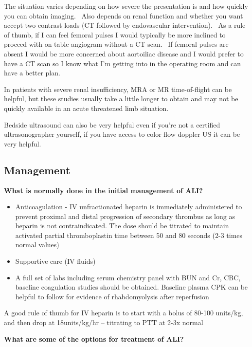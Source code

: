 \documentclass[
]{book}
\begin{document}
The situation varies depending on how severe the presentation is and how
quickly you can obtain imaging.~ Also depends on renal function and
whether you want accept two contrast loads (CT followed by endovascular
intervention).~ As a rule of thumb, if I can feel femoral pulses I would
typically be more inclined to proceed with on-table angiogram without a
CT scan.~ If femoral pulses are absent I would be more concerned about
aortoiliac disease and I would prefer to have a CT scan so I know what
I'm getting into in the operating room and can have a better plan.

In patients with severe renal insufficiency, MRA or MR time-of-flight
can be helpful, but these studies usually take a little longer to obtain
and may not be quickly available in an acute threatened limb situation.

Bedside ultrasound can also be very helpful even if you're not a
certified ultrasonographer yourself, if you have access to color flow
doppler US it can be very helpful.

\hypertarget{management-3}{%
\subsection{Management}\label{management-3}}

\textbf{What is normally done in the initial management of ALI?}

\begin{itemize}
\item
  Anticoagulation - IV unfractionated heparin is immediately
  administered to prevent proximal and distal progression of secondary
  thrombus as long as heparin is not contraindicated. The dose should
  be titrated to maintain activated partial thromboplastin time
  between 50 and 80 seconds (2-3 times normal values)
\item
  Supportive care (IV fluids)
\item
  A full set of labs including serum chemistry panel with BUN and Cr,
  CBC, baseline coagulation studies should be obtained. Baseline
  plasma CPK can be helpful to follow for evidence of rhabdomyolysis
  after reperfusion
\end{itemize}

A good rule of thumb for IV heparin is to start with a bolus of 80-100
units/kg, and then drop at 18units/kg/hr -- titrating to PTT at 2-3x
normal

\textbf{What are some of the options for treatment of ALI?}
\end{document}
